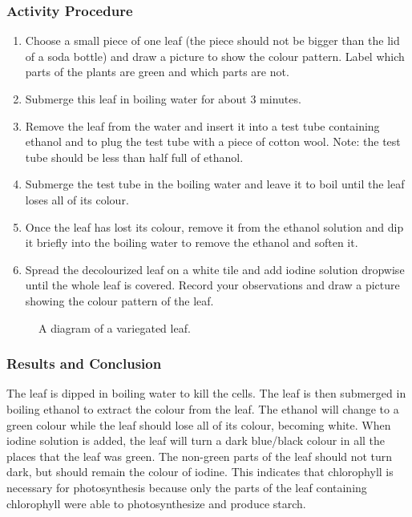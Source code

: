 \subsubsection*{Activity Procedure}
\begin{enumerate}
\item{Choose a small piece of one leaf (the piece should not be bigger than the lid of a soda bottle) and draw a picture to show the colour pattern. Label which parts of the plants are green and which parts are not.}
\item{Submerge this leaf in boiling water for about 3 minutes.}
\item{Remove the leaf from the water and insert it into a test tube containing ethanol and to plug the test tube with a piece of cotton wool. Note: the test tube should be less than half full of ethanol.}
\item{Submerge the test tube in the boiling water and leave it to boil until the leaf loses all of its colour.}
\item{Once the leaf has lost its colour, remove it from the ethanol solution and dip it briefly into the boiling water to remove the ethanol and soften it.}
\item{Spread the decolourized leaf on a white tile and add iodine solution dropwise until the whole leaf is covered. Record your observations and draw a picture showing the colour pattern of the leaf.}
\end{enumerate}

\begin{figure}[h]
\begin{center}
\def\svgwidth{6cm}

\caption{A diagram of a variegated leaf.}
\label{fig:variegate leaf}
\end{center}
\end{figure}

\subsubsection*{Results and Conclusion}
The leaf is dipped in boiling water to kill the cells. The leaf is then submerged in boiling ethanol to extract the colour from the leaf. The ethanol will change to a green colour while the leaf should lose all of its colour, becoming white. When iodine solution is added, the leaf will turn a dark blue/black colour in all the places that the leaf was green. The non-green parts of the leaf should not turn dark, but should remain the colour of iodine. This indicates that chlorophyll is necessary for photosynthesis because only the parts of the leaf containing chlorophyll were able to photosynthesize and produce starch.

